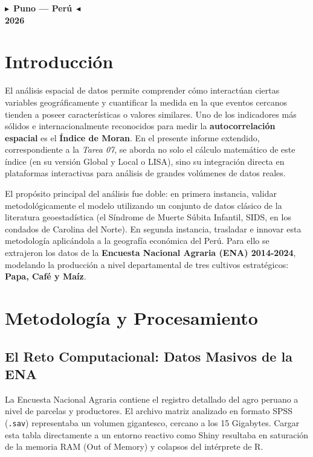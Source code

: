 \documentclass[12pt,a4paper]{article}
\begin{document}
\begin{titlepage}
\begin{center}
\vspace{0.6cm}


\vspace{0.35cm}

{\color{azul}$\blacktriangleright$}~{\large \textbf{Puno --- Perú}}~{\color{azul}$\blacktriangleleft$}\\[0.2cm]
{\fontsize{20}{24}\selectfont \textbf{\color{azul}2026}}

\end{center}

\end{titlepage}

\newpage

\section{Introducción}
El análisis espacial de datos permite comprender cómo interactúan ciertas variables geográficamente y cuantificar la medida en la que eventos cercanos tienden a poseer características o valores similares. Uno de los indicadores más sólidos e internacionalmente reconocidos para medir la \textbf{autocorrelación espacial} es el \textbf{Índice de Moran}. En el presente informe extendido, correspondiente a la \textit{Tarea 07}, se aborda no solo el cálculo matemático de este índice (en su versión Global y Local o LISA), sino su integración directa en plataformas interactivas para análisis de grandes volúmenes de datos reales.

El propósito principal del análisis fue doble: en primera instancia, validar metodológicamente el modelo utilizando un conjunto de datos clásico de la literatura geoestadística (el Síndrome de Muerte Súbita Infantil, SIDS, en los condados de Carolina del Norte). En segunda instancia, trasladar e innovar esta metodología aplicándola a la geografía económica del Perú. Para ello se extrajeron los datos de la \textbf{Encuesta Nacional Agraria (ENA) 2014-2024}, modelando la producción a nivel departamental de tres cultivos estratégicos: \textbf{Papa, Café y Maíz}.

\section{Metodología y Procesamiento}

\subsection{El Reto Computacional: Datos Masivos de la ENA}
La Encuesta Nacional Agraria contiene el registro detallado del agro peruano a nivel de parcelas y productores. El archivo matriz analizado en formato SPSS (\texttt{.sav}) representaba un volumen gigantesco, cercano a los 15 Gigabytes. Cargar esta tabla directamente a un entorno reactivo como Shiny resultaba en saturación de la memoria RAM (Out of Memory) y colapsos del intérprete de R.
\end{document}
